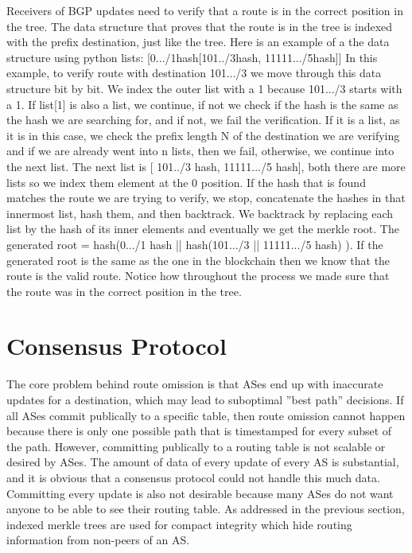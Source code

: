 \documentclass[letterpaper, 10 pt, conference]{ieeeconf}  %
\begin{document}
Receivers of BGP updates need to verify that a route is in the correct position in the tree. The data structure that proves that the route is in the tree is indexed with the prefix destination, just like the tree. Here is an example of a the data structure using python lists: [0.../1hash[101../3hash, 11111.../5hash]] In this example, to verify route with destination 101.../3 we move through this data structure bit by bit. We index the outer list with a 1 because 101.../3 starts with a 1. If list[1] is also a list, we continue, if not we check if the hash is the same as the hash we are searching for, and if not, we fail the verification. If it is a list, as it is in this case, we check the prefix length N of the destination we are verifying and if we are already went into n lists, then we fail, otherwise, we continue into the next list. The next list is [ 101../3 hash, 11111.../5 hash], both there are more lists so we index them element at the 0 position. If the hash that is found matches the route we are trying to verify, we stop, concatenate the hashes in that innermost list, hash them, and then backtrack. We backtrack by replacing each list by the hash of its inner elements and eventually we get the merkle root. The generated root = hash(0.../1 hash || hash(101.../3 || 11111.../5 hash) ). If the generated root is the same as the one in the blockchain then we know that the route is the valid route. Notice how throughout the process we made sure that the route was in the correct position in the tree.


\section{Consensus Protocol}

The core problem behind route omission is that ASes end up with inaccurate updates for a destination, which may lead to suboptimal ”best path” decisions. If all ASes commit publically to a specific table, then route omission cannot happen because there is only one possible path that is timestamped for every subset of the path. However, committing publically to a routing table is not scalable or desired by ASes. The amount of data of every update of every AS is substantial, and it is obvious that a consensus protocol could not handle this much data. Committing every update is also not desirable because many ASes do not want anyone to be able to see their routing table. As addressed in the previous section, indexed merkle trees are used for compact integrity which hide routing information from non-peers of an AS.
\end{document}
